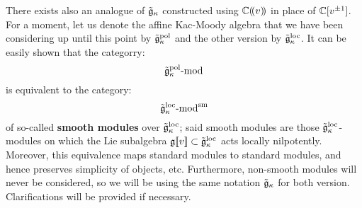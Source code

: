        \begin{remark}
            There exists also an analogue of $\tilde{\mathfrak{g}}_{\kappa}$ constructed using $\mathbb{C}(\!(v)\!)$ in place of $\mathbb{C}[v^{\pm 1}]$. For a moment, let us denote the affine Kac-Moody algebra that we have been considering up until this point by $\tilde{\mathfrak{g}}_{\kappa}^{\mathrm{pol}}$ and the other version by $\tilde{\mathfrak{g}}_{\kappa}^{\mathrm{loc}}$. It can be easily shown that the categorry:
                $$\tilde{\mathfrak{g}}_{\kappa}^{\mathrm{pol}}\text{-}\mathrm{mod}$$
            is equivalent to the category:
                $$\tilde{\mathfrak{g}}_{\kappa}^{\mathrm{loc}}\text{-}\mathrm{mod}^{\mathrm{sm}}$$
            of so-called \textbf{smooth modules} over $\tilde{\mathfrak{g}}_{\kappa}^{\mathrm{loc}}$; said smooth modules are those $\tilde{\mathfrak{g}}_{\kappa}^{\mathrm{loc}}$-modules on which the Lie subalgebra $\mathfrak{g}[\![v]\!] \subset \tilde{\mathfrak{g}}_{\kappa}^{\mathrm{loc}}$ acts locally nilpotently. Moreover, this equivalence maps standard modules to standard modules, and hence preserves simplicity of objects, etc. Furthermore, non-smooth modules will never be considered, so we will be using the same notation $\tilde{\mathfrak{g}}_{\kappa}$ for both version. Clarifications will be provided if necessary.
        \end{remark}

